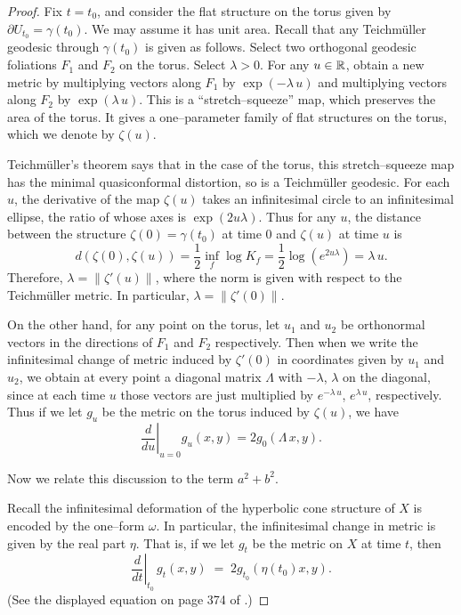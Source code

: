 \begin{proof}
Fix $t=t_0$, and consider the flat structure on the torus given by
$\partial U_{t_0} = \gamma(t_0)$.  We may assume it has unit area.
Recall that any Teichm\"uller geodesic through $\gamma(t_0)$ is given
as follows.  Select two orthogonal geodesic foliations $F_1$ and $F_2$
on the torus.  Select $\lambda>0$.  For any $u \in {\mathbb{R}}$, obtain a new
metric by multiplying vectors along $F_1$ by $\exp(-\lambda\,u)$ and
multiplying vectors along $F_2$ by $\exp(\lambda\,u)$.  This is a
``stretch--squeeze'' map, which preserves the area of the torus.  It
gives a one--parameter family of flat structures on the torus, which
we denote by $\zeta(u)$.

Teichm\"uller's theorem says that in the case of the torus, this
stretch--squeeze map has the minimal quasiconformal distortion, so is
a Teichm\"uller geodesic.  For each $u$, the derivative of the map
$\zeta(u)$ takes an infinitesimal circle to an infinitesimal ellipse,
the ratio of whose axes is $\exp(2u\lambda)$.  Thus for any $u$,
the distance between the structure $\zeta(0) = \gamma(t_0)$ at time
$0$ and $\zeta(u)$ at time $u$ is
$$d(\zeta(0), \zeta(u)) = \frac{1}{2}\inf_f\log K_f =
\frac{1}{2}\log(e^{2u\lambda}) = \lambda\,u.$$ 
Therefore, $\lambda = \| \zeta'(u) \|$, where the norm is given with
respect to the Teichm\"uller metric.  In particular, $\lambda =
\|\zeta'(0)\|$.

On the other hand, for any point on the torus, let $u_1$ and $u_2$ be
orthonormal vectors in the directions of $F_1$ and $F_2$ respectively.
Then when we write the infinitesimal change of metric induced by
$\zeta'(0)$ in coordinates given by $u_1$ and $u_2$, we obtain at
every point a diagonal matrix $\Lambda$ with $-\lambda$, $\lambda$ on
the diagonal, since at each time $u$ those vectors are just multiplied
by $e^{-\lambda\,u}$, $e^{\lambda\,u}$, respectively.  Thus if we let
$g_u$ be the metric on the torus induced by $\zeta(u)$, we have
$$\left.\frac{d}{du}\right|_{u=0} g_u(x,y) = 2 g_0(\Lambda\,x, y).$$

Now we relate this discussion to the term $a^2+b^2$.

Recall the infinitesimal deformation of the hyperbolic cone structure
of $X$ is encoded by the one--form $\omega$.  In particular, the
infinitesimal change in metric is given by the real part $\eta$.  That
is, if we let $g_t$ be the metric on $X$ at time $t$, then 
\begin{equation}
\left.\frac{d}{dt}\right|_{t_0}\, g_t(x,y) \;=\; 2 g_{t_0}(\eta(t_0) x, y).
\label{eqn:dotg}
\end{equation}
(See the displayed equation on page 374 of \cite{hk:univ}.)


\end{proof}
